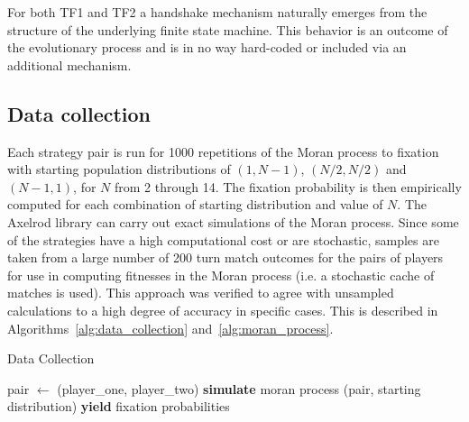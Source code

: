 \documentclass[10pt,letterpaper]{article}
\begin{document}
For both TF1 and TF2 a handshake
mechanism naturally emerges from the structure of the underlying finite state
machine. This behavior is an outcome of the evolutionary process and is in no
way hard-coded or included via an additional mechanism.

\begin{table}[!hbtp]
    \centering
        \caption{Memory depths}
        \label{tbl:memory_depth_count}
\end{table}

\subsection*{Data collection}

Each strategy pair is run for 1000 repetitions of the Moran process to fixation
with starting population distributions of $(1, N-1)$, $(N/2, N/2)$ and $(N-1 ,
1)$, for \(N\) from 2 through 14. The fixation probability is then empirically
computed for each combination of starting distribution and value of \(N\). The
Axelrod library can carry out exact simulations of the Moran process. Since some
of the strategies have a high computational cost or are stochastic, samples are
taken from a large number of 200 turn match outcomes for the pairs of players
for use in computing fitnesses in the Moran process (i.e. a stochastic cache of
matches is used). This approach was verified to agree with unsampled
calculations to a high degree of accuracy in specific cases. This is described
in Algorithms~\ref{alg:data_collection} and~\ref{alg:moran_process}.

\begin{algorithm}[!hbtp]
        \caption{Data Collection}
        \label{alg:data_collection}
          \begin{algorithmic}[1]
                \STATE pair $\gets$ (player\_one, player\_two)
                \STATE \textbf{simulate} moran process (pair, starting distribution)
                \ENDWHILE
                \STATE\textbf{yield} fixation probabilities
                \ENDFOR
              \ENDFOR
            \ENDFOR
          \end{algorithmic}
\end{algorithm}
\end{document}
